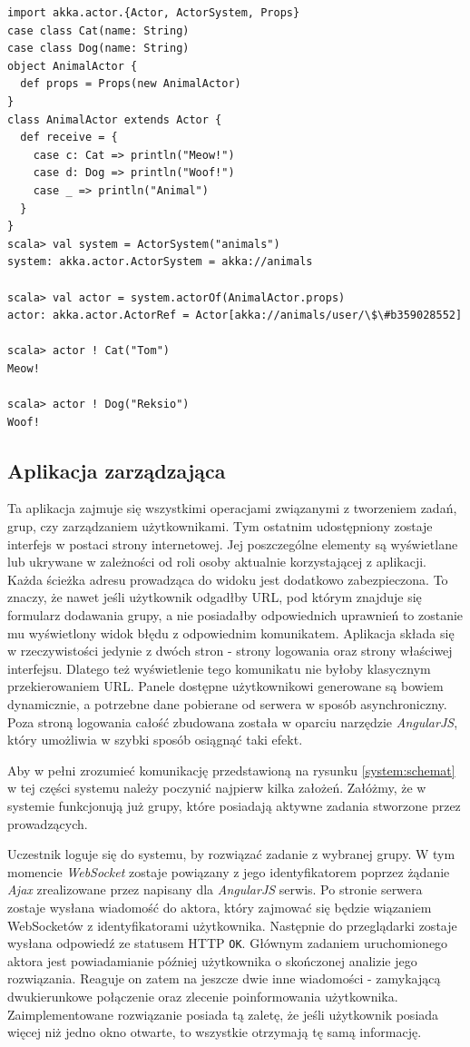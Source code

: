 \documentclass[brudnopis]{xmgr}
\begin{document}
\begin{verbatim}
import akka.actor.{Actor, ActorSystem, Props}
case class Cat(name: String)
case class Dog(name: String)
object AnimalActor {
  def props = Props(new AnimalActor)
}
class AnimalActor extends Actor {
  def receive = {
    case c: Cat => println("Meow!")
    case d: Dog => println("Woof!")
    case _ => println("Animal")
  }
}
scala> val system = ActorSystem("animals")
system: akka.actor.ActorSystem = akka://animals

scala> val actor = system.actorOf(AnimalActor.props)
actor: akka.actor.ActorRef = Actor[akka://animals/user/\$\#b359028552]

scala> actor ! Cat("Tom")
Meow!

scala> actor ! Dog("Reksio")
Woof!
\end{verbatim}

\subsection{Aplikacja zarządzająca}

Ta aplikacja zajmuje się wszystkimi operacjami związanymi z tworzeniem zadań, grup, czy zarządzaniem użytkownikami. Tym ostatnim udostępniony zostaje interfejs w postaci strony internetowej. Jej poszczególne elementy są wyświetlane lub ukrywane w zależności od roli osoby aktualnie korzystającej z aplikacji. Każda ścieżka adresu prowadząca do widoku jest dodatkowo zabezpieczona. To znaczy, że nawet jeśli użytkownik odgadłby URL, pod którym znajduje się formularz dodawania grupy, a nie posiadałby odpowiednich uprawnień to zostanie mu wyświetlony widok błędu z odpowiednim komunikatem. 
Aplikacja składa się w rzeczywistości jedynie z dwóch stron - strony logowania oraz strony właściwej interfejsu. Dlatego też wyświetlenie tego komunikatu nie byłoby klasycznym przekierowaniem URL.
Panele dostępne użytkownikowi generowane są bowiem dynamicznie, a potrzebne dane pobierane od serwera w sposób asynchroniczny. Poza stroną logowania całość zbudowana została w oparciu narzędzie \emph{AngularJS}, który umożliwia w szybki sposób osiągnąć taki efekt.

Aby w pełni zrozumieć komunikację przedstawioną na rysunku \ref{system:schemat} w tej części systemu należy poczynić najpierw kilka założeń. Załóżmy, że w systemie funkcjonują już grupy, które posiadają aktywne zadania stworzone przez prowadzących. 

Uczestnik loguje się do systemu, by rozwiązać zadanie z wybranej grupy. W tym momencie \emph{WebSocket} zostaje powiązany z jego identyfikatorem poprzez żądanie \emph{Ajax} zrealizowane przez napisany dla \emph{AngularJS} serwis. Po stronie serwera zostaje wysłana wiadomość do aktora, który zajmować się będzie wiązaniem WebSocketów z identyfikatorami użytkownika. Następnie do przeglądarki zostaje wysłana odpowiedź ze statusem HTTP \texttt{OK}. Głównym zadaniem uruchomionego aktora jest powiadamianie później użytkownika o skończonej analizie jego rozwiązania. Reaguje on zatem na jeszcze dwie inne wiadomości - zamykającą dwukierunkowe połączenie oraz zlecenie poinformowania użytkownika. Zaimplementowane rozwiązanie posiada tą zaletę, że jeśli użytkownik posiada więcej niż jedno okno otwarte, to wszystkie otrzymają tę samą informację. 
\end{document}
